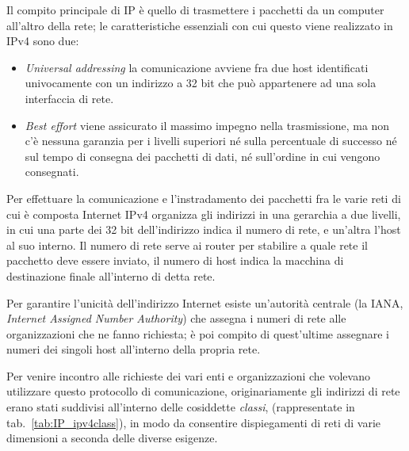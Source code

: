 Il compito principale di IP è quello di trasmettere i pacchetti da un computer
all'altro della rete; le caratteristiche essenziali con cui questo viene
realizzato in IPv4 sono due:
\begin{itemize}
\item \textit{Universal addressing} la comunicazione avviene fra due host
  identificati univocamente con un indirizzo a 32 bit che può appartenere ad
  una sola interfaccia di rete.
\item \textit{Best effort} viene assicurato il massimo impegno nella
  trasmissione, ma non c'è nessuna garanzia per i livelli superiori né
  sulla percentuale di successo né sul tempo di consegna dei pacchetti di
  dati, né sull'ordine in cui vengono consegnati.
\end{itemize}

Per effettuare la comunicazione e l'instradamento dei pacchetti fra le varie
reti di cui è composta Internet IPv4 organizza gli indirizzi in una
gerarchia a due livelli, in cui una parte dei 32 bit dell'indirizzo indica il
numero di rete, e un'altra l'host al suo interno.  Il numero di rete serve
ai router per stabilire a quale rete il pacchetto deve essere inviato, il
numero di host indica la macchina di destinazione finale all'interno di detta
rete.

Per garantire l'unicità dell'indirizzo Internet esiste un'autorità centrale
(la IANA, \textit{Internet Assigned Number Authority}) che assegna i numeri di
rete alle organizzazioni che ne fanno richiesta; è poi compito di quest'ultime
assegnare i numeri dei singoli host all'interno della propria rete.

Per venire incontro alle richieste dei vari enti e organizzazioni che volevano
utilizzare questo protocollo di comunicazione, originariamente gli indirizzi
di rete erano stati suddivisi all'interno delle cosiddette \textit{classi},
(rappresentate in tab.~\ref{tab:IP_ipv4class}), in modo da consentire
dispiegamenti di reti di varie dimensioni a seconda delle diverse esigenze.

